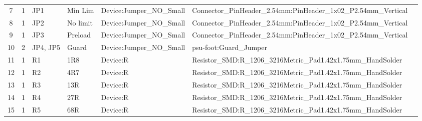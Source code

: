 \documentclass[letterpaper,twocolumn,11pt]{article}
\begin{document}
\begin{sidewaystable*}[ht]
{\begin{tabular}{cclllll}
      7                      & 1                                                        & JP1                    & Min Lim                & Device:Jumper\_NO\_Small         & Connector\_PinHeader\_2.54mm:PinHeader\_1x02\_P2.54mm\_Vertical                                         \\
      8                      & 1                                                        & JP2                    & No limit               & Device:Jumper\_NO\_Small         & Connector\_PinHeader\_2.54mm:PinHeader\_1x02\_P2.54mm\_Vertical                                         \\
      9                      & 1                                                        & JP3                    & Preload                & Device:Jumper\_NO\_Small         & Connector\_PinHeader\_2.54mm:PinHeader\_1x02\_P2.54mm\_Vertical                                         \\
      10                     & 2                                                        & JP4, JP5               & Guard                  & Device:Jumper\_NO\_Small         & psu-foot:Guard\_Jumper                                                                                  \\
      11                     & 1                                                        & R1                     & 1R8                    & Device:R                         & Resistor\_SMD:R\_1206\_3216Metric\_Pad1.42x1.75mm\_HandSolder                                           \\
      12                     & 1                                                        & R2                     & 4R7                    & Device:R                         & Resistor\_SMD:R\_1206\_3216Metric\_Pad1.42x1.75mm\_HandSolder                                           \\
      13                     & 1                                                        & R3                     & 13R                    & Device:R                         & Resistor\_SMD:R\_1206\_3216Metric\_Pad1.42x1.75mm\_HandSolder                                           \\
      14                     & 1                                                        & R4                     & 27R                    & Device:R                         & Resistor\_SMD:R\_1206\_3216Metric\_Pad1.42x1.75mm\_HandSolder                                           \\
      15                     & 1                                                        & R5                     & 68R                    & Device:R                         & Resistor\_SMD:R\_1206\_3216Metric\_Pad1.42x1.75mm\_HandSolder                                           \\

\end{tabular}}
\end{sidewaystable*}
\end{document}
